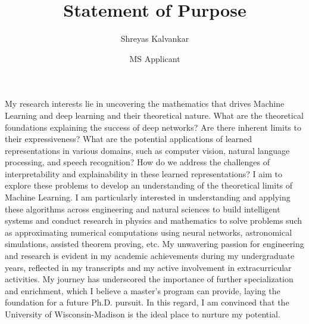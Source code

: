 \documentclass{article}
\title{Statement of Purpose}
\author{Shreyas Kalvankar}
\date{MS Applicant}
\begin{document}
  \maketitle%
  \thispagestyle{empty}
\vspace{2pt}
\hspace{0.25in}My research interests lie in uncovering the mathematics that
drives Machine Learning and deep learning and their theoretical nature. What are
the theoretical foundations explaining the success of deep networks? Are there
inherent limits to their expressiveness? What are the potential applications of
learned representations in various domains, such as computer vision, natural
language processing, and speech recognition? How do we address the challenges of
interpretability and explainability in these learned representations? I aim to
explore these problems to develop an understanding of the theoretical limits of
Machine Learning. I am particularly interested in understanding and applying
these algorithms across engineering and natural sciences to build intelligent
systems and conduct research in physics and mathematics to solve problems such
as approximating numerical computations using neural networks, astronomical
simulations, assisted theorem proving, etc. My unwavering passion for
engineering and research is evident in my academic achievements during my
undergraduate years, reflected in my transcripts and my active involvement in
extracurricular activities. My journey has underscored the importance of further
specialization and enrichment, which I believe a master's program can provide,
laying the foundation for a future Ph.D. pursuit. In this regard, I am convinced
that the University of Wisconsin-Madison is the ideal place to nurture my
potential.
\vspace{2pt}
\end{document}
